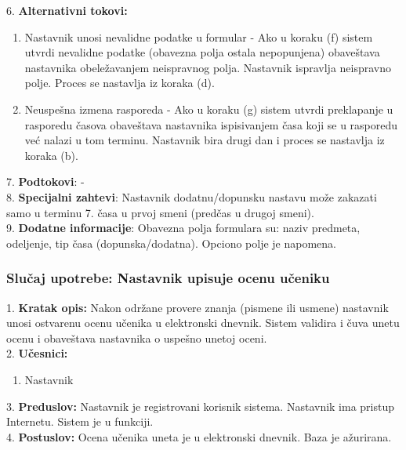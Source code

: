 \documentclass{article}
\begin{document}
6. \textbf{Alternativni tokovi:}
\begin{enumerate} [label=(\roman*)]
\item Nastavnik unosi nevalidne podatke u formular - Ako u koraku (f) sistem utvrdi nevalidne podatke (obavezna polja ostala nepopunjena) obaveštava nastavnika obeležavanjem neispravnog polja. Nastavnik ispravlja neispravno polje. Proces se nastavlja iz koraka (d).
\item Neuspešna izmena rasporeda - Ako u koraku (g) sistem utvrdi preklapanje u rasporedu časova obaveštava nastavnika ispisivanjem časa koji se u rasporedu već nalazi u tom terminu. Nastavnik bira drugi dan i proces se nastavlja iz koraka (b).

\end{enumerate}

7. \textbf{Podtokovi}: - \\

8. \textbf{Specijalni zahtevi}: Nastavnik dodatnu/dopunsku nastavu može zakazati samo u terminu 7. časa u prvoj smeni (predčas u drugoj smeni). \\

9. \textbf{Dodatne informacije}: Obavezna polja formulara su: naziv predmeta, odeljenje, tip časa (dopunska/dodatna). Opciono polje je napomena. \\


\subsubsection{Slučaj upotrebe: Nastavnik upisuje ocenu učeniku} 
1. \textbf{Kratak opis:} Nakon održane provere znanja (pismene ili usmene) nastavnik unosi ostvarenu ocenu učenika u elektronski dnevnik. Sistem validira i čuva unetu ocenu i obaveštava nastavnika o uspešno unetoj oceni.  \\

2. \textbf{Učesnici:}
\begin{enumerate} [label=(\alph*)]
\item Nastavnik
\end{enumerate} 

3. \textbf{Preduslov:} Nastavnik je registrovani korisnik sistema. Nastavnik ima pristup Internetu. Sistem je u funkciji. \\

4. \textbf{Postuslov:} Ocena učenika uneta je u elektronski dnevnik. Baza je ažurirana.\\
\end{document}
